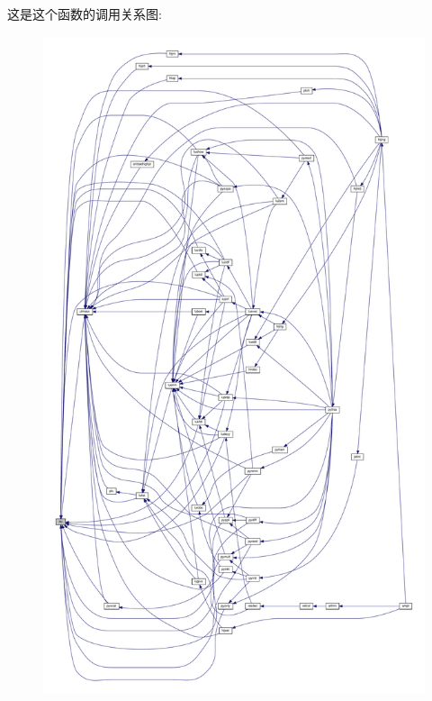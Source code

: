 这是这个函数的调用关系图\+:
\nopagebreak
\begin{figure}[H]
\begin{center}
\leavevmode
\includegraphics[height=550pt]{rlu_8f90_a6b38caf89e085f54e77042a37a775ba6_icgraph}
\end{center}
\end{figure}

